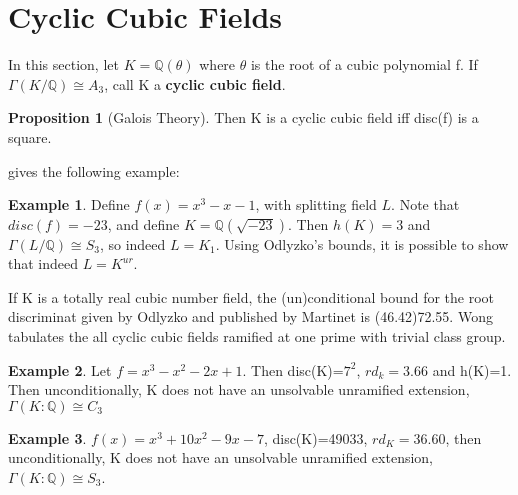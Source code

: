 \documentclass[12pt]{extarticle}
\newcommand{\Q}{\mathbb{Q}}
\newcommand{\<}{\langle}
\renewcommand{\>}{\rangle}
\theoremstyle{definition}
\newtheorem{proposition}{Proposition}
\newtheorem*{example}{Example}
\begin{document}
 \section{Cyclic Cubic Fields}
In this section, let $K=\Q(\theta)$ where $\theta$ is the root of a cubic polynomial 
f. If $\Gamma(K/\Q) \cong A_3$, call K a  \textbf{cyclic cubic field}.
\begin{proposition}[Galois Theory]
Then K is a cyclic cubic field iff disc(f) is a square. 

\cite{SERR} gives the following example:
\begin{example}
Define $f(x) = x^3-x-1$, with splitting field $L$. Note that $disc(f)=-23$, and define $K=\Q(\sqrt{-23})$. Then $h(K)=3$ and $\Gamma(L/\Q) \cong S_3$, so indeed $L=K_1$. Using Odlyzko's bounds, it is possible to show that indeed $L = K^{ur}$.
\end{example}

\end{proposition} If K is a totally real cubic number field, the (un)conditional bound for the root discriminat given by Odlyzko and published by Martinet is (46.42)72.55. Wong tabulates the all cyclic cubic fields ramified at one prime with trivial class group. 
\begin{example}
    Let $f=x^3-x^2-2x+1$. Then disc(K)=$7^2$, $rd_{k}=3.66$ and h(K)=1. Then unconditionally, K does not have an unsolvable unramified extension, $\Gamma(K:\mathbb{Q})\cong C_3$
\end{example}
\begin{example}
    $f(x)=x^3 + 10x^2 - 9x - 7$, disc(K)=49033, $rd_{K}=36.60$, then unconditionally, K does not have an unsolvable unramified extension, $\Gamma(K:\mathbb{Q})\cong S_3$.
\end{example}
\end{document}
